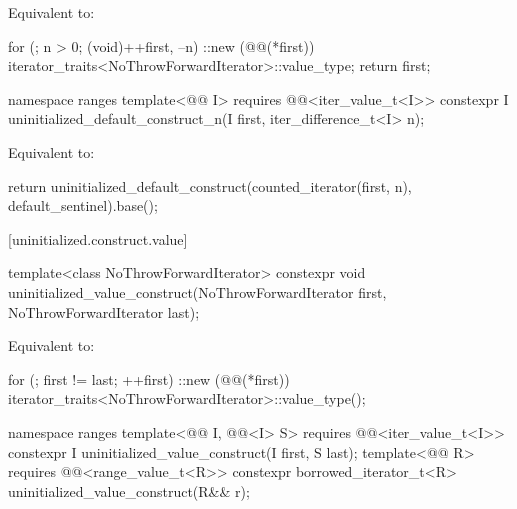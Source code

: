 \begin{itemdescr}
\pnum
\effects
Equivalent to:
\begin{codeblock}
for (; n > 0; (void)++first, --n)
  ::new (@@(*first)) iterator_traits<NoThrowForwardIterator>::value_type;
return first;
\end{codeblock}
\end{itemdescr}

%
\begin{itemdecl}
namespace ranges {
  template<@@ I>
    requires @@<iter_value_t<I>>
    constexpr I uninitialized_default_construct_n(I first, iter_difference_t<I> n);
}
\end{itemdecl}

\begin{itemdescr}
\pnum
\effects
Equivalent to:
\begin{codeblock}
return uninitialized_default_construct(counted_iterator(first, n),
                                       default_sentinel).base();
\end{codeblock}
\end{itemdescr}

[uninitialized.construct.value]{}

%
\begin{itemdecl}
template<class NoThrowForwardIterator>
  constexpr void uninitialized_value_construct(NoThrowForwardIterator first,
                                               NoThrowForwardIterator last);
\end{itemdecl}

\begin{itemdescr}
\pnum
\effects
Equivalent to:
\begin{codeblock}
for (; first != last; ++first)
  ::new (@@(*first)) iterator_traits<NoThrowForwardIterator>::value_type();
\end{codeblock}
\end{itemdescr}

%
\begin{itemdecl}
namespace ranges {
  template<@@ I, @@<I> S>
    requires @@<iter_value_t<I>>
    constexpr I uninitialized_value_construct(I first, S last);
  template<@@ R>
    requires @@<range_value_t<R>>
    constexpr borrowed_iterator_t<R> uninitialized_value_construct(R&& r);
}
\end{itemdecl}

